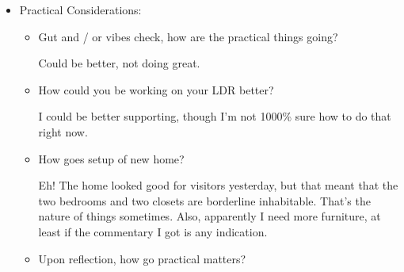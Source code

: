 \documentclass[12pt]{article}
\newcommand{\say}[1]{``#1''}
\renewcommand{\,}{\textsuperscript{,}}
\begin{document}
\begin{itemize}
\begin{itemize}
\item Water?

Not as well as it could be! Sad, but I'll grab my bottle now and have some water.

\item Sleep?

Decent! I think that for at least a little longer I can go back to biphasic sleep, which does a lot for me in general.

\item Social? Wins / areas of struggle?

Social! Made new friends. An old college acquaintance and I reconnected, they bought me birthday dinner!

I hosted a housewarming party, and friends came!

I finally gave someone their wedding present.

Area of struggle definitely the whole \say{I sometimes interrupt people way too much}, and I don't like that, esp. bc I noticed that it's happening more with some people.

\item Upon reflection, how is health going?

Generally ok!

\end{itemize}  
   
 \item Practical Considerations:  
 \begin{itemize}  
 \item Gut and / or vibes check, how are the practical things going?

Could be better, not doing great.

\item How could you be working on your LDR better?

I could be better supporting, though I'm not 1000\% sure how to do that right now.

\item How goes setup of new home?

Eh! The home looked good for visitors yesterday, but that meant that the two bedrooms and two closets are borderline inhabitable.  
That's the nature of things sometimes.  
Also, apparently I need more furniture, at least if the commentary I got is any indication.

\item Upon reflection, how go practical matters?


\end{itemize}
\end{itemize}
\end{document}
